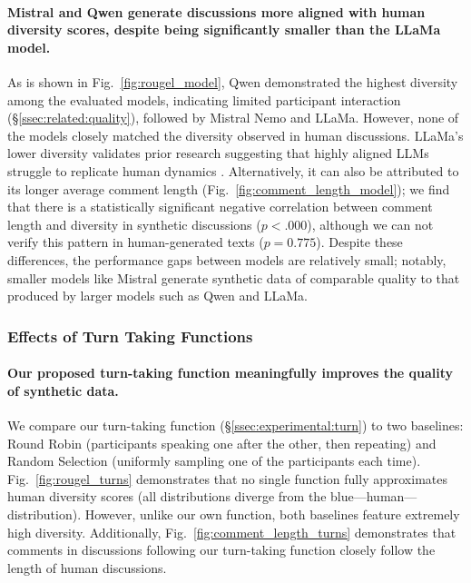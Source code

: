 \paragraph{Mistral and Qwen generate discussions more aligned with human diversity scores, despite being significantly smaller than the LLaMa model.} As is shown in Fig.~\ref{fig:rougel_model}, Qwen demonstrated the highest diversity among the evaluated models, indicating limited participant interaction (\S\ref{ssec:related:quality}), followed by Mistral Nemo and LLaMa. However, none of the models closely matched the diversity observed in human discussions. 
LLaMa's lower diversity validates prior research suggesting that highly aligned \acp{LLM} struggle to replicate human dynamics \cite{Park2023GenerativeAI, leng_2024}. Alternatively, it can also be attributed to its longer average comment length (Fig.~\ref{fig:comment_length_model}); we find that there is a statistically significant negative correlation between comment length and diversity in synthetic discussions ($p < .000$), although we can not verify this pattern in human-generated texts ($p = 0.775$). Despite these differences, the performance gaps between models are relatively small; notably, smaller models like Mistral generate synthetic data of comparable quality to that produced by larger models such as Qwen and LLaMa.


\subsubsection{Effects of Turn Taking Functions}

\paragraph{Our proposed turn-taking function meaningfully improves the quality of synthetic data.} We compare our turn-taking function (\S\ref{ssec:experimental:turn}) to two baselines: Round Robin (participants speaking one after the other, then repeating) and Random Selection (uniformly sampling one of the participants each time). Fig.~\ref{fig:rougel_turns} demonstrates that no single function fully approximates human diversity scores (all distributions diverge from the blue—human—distribution). However, unlike our own function, both baselines feature extremely high diversity. Additionally, Fig.~\ref{fig:comment_length_turns} demonstrates that comments in discussions following our turn-taking function closely follow the length of human discussions. %


